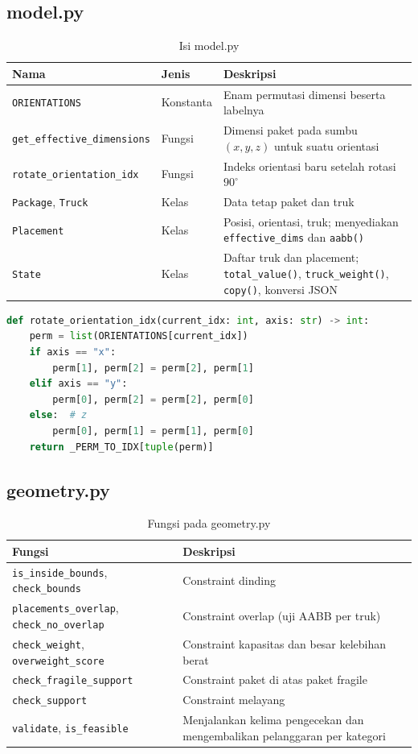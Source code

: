 \documentclass[12pt,a4paper]{report}
\newcommand{\hd}[1]{\cellcolor{hdr}\textbf{#1}}
\newcommand{\code}[1]{\texttt{\small #1}}
\begin{document}
\subsection{model.py}
\begin{table}[H]
\centering
\caption{Isi model.py}
\small
\begin{tabular}{|L{5.2cm}|L{1.8cm}|L{6.2cm}|}
\hline
\hd{Nama} & \hd{Jenis} & \hd{Deskripsi} \\ \hline
\code{ORIENTATIONS} & Konstanta & Enam permutasi dimensi beserta labelnya \\ \hline
\code{get\_effective\_dimensions} & Fungsi & Dimensi paket pada sumbu $(x,y,z)$ untuk suatu orientasi \\ \hline
\code{rotate\_orientation\_idx} & Fungsi & Indeks orientasi baru setelah rotasi $90^\circ$ \\ \hline
\code{Package}, \code{Truck} & Kelas & Data tetap paket dan truk \\ \hline
\code{Placement} & Kelas & Posisi, orientasi, truk; menyediakan \code{effective\_dims} dan \code{aabb()} \\ \hline
\code{State} & Kelas & Daftar truk dan placement; \code{total\_value()}, \code{truck\_weight()}, \code{copy()}, konversi JSON \\ \hline
\end{tabular}
\end{table}

\begin{lstlisting}[language=Python]
def rotate_orientation_idx(current_idx: int, axis: str) -> int:
    perm = list(ORIENTATIONS[current_idx])
    if axis == "x":
        perm[1], perm[2] = perm[2], perm[1]
    elif axis == "y":
        perm[0], perm[2] = perm[2], perm[0]
    else:  # z
        perm[0], perm[1] = perm[1], perm[0]
    return _PERM_TO_IDX[tuple(perm)]
\end{lstlisting}

\subsection{geometry.py}
\begin{table}[H]
\centering
\caption{Fungsi pada geometry.py}
\small
\begin{tabular}{|L{5cm}|L{8.2cm}|}
\hline
\hd{Fungsi} & \hd{Deskripsi} \\ \hline
\code{is\_inside\_bounds}, \code{check\_bounds} & Constraint dinding \\ \hline
\code{placements\_overlap}, \code{check\_no\_overlap} & Constraint overlap (uji AABB per truk) \\ \hline
\code{check\_weight}, \code{overweight\_score} & Constraint kapasitas dan besar kelebihan berat \\ \hline
\code{check\_fragile\_support} & Constraint paket di atas paket fragile \\ \hline
\code{check\_support} & Constraint melayang \\ \hline
\code{validate}, \code{is\_feasible} & Menjalankan kelima pengecekan dan mengembalikan pelanggaran per kategori \\ \hline
\end{tabular}
\end{table}
\end{document}
